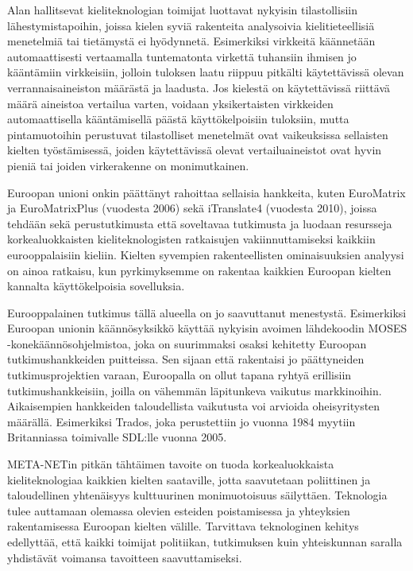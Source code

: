 \documentclass[]{../../metanetpaper}
\begin{document}
\begin{Parallel}[c]{70mm}{70mm}
{Alan hallitsevat kieliteknologian toimijat luottavat nykyisin tilastollisiin
lähestymistapoihin, joissa kielen syviä rakenteita analysoivia
kielitieteellisiä menetelmiä tai tietämystä ei hyödynnetä. Esimerkiksi
virkkeitä käännetään automaattisesti vertaamalla tuntematonta virkettä
tuhansiin ihmisen jo kääntämiin virkkeisiin, jolloin tuloksen laatu riippuu
pitkälti käytettävissä olevan verrannaisaineiston määrästä ja laadusta. Jos
kielestä on käytettävissä riittävä määrä aineistoa vertailua varten, voidaan
yksikertaisten virkkeiden automaattisella kääntämisellä päästä käyttökelpoisiin
tuloksiin, mutta pintamuotoihin perustuvat tilastolliset menetelmät ovat
vaikeuksissa sellaisten kielten työstämisessä, joiden käytettävissä olevat
vertailuaineistot ovat hyvin pieniä tai joiden virkerakenne on monimutkainen.

Euroopan unioni onkin päättänyt rahoittaa sellaisia hankkeita, kuten EuroMatrix
ja EuroMatrixPlus (vuodesta 2006) sekä iTranslate4 (vuodesta 2010), joissa
tehdään sekä perustutkimusta että soveltavaa tutkimusta ja luodaan resursseja
korkealuokkaisten kieliteknologisten ratkaisujen vakiinnuttamiseksi kaikkiin
eurooppalaisiin kieliin. Kielten syvempien rakenteellisten ominaisuuksien
analyysi on ainoa ratkaisu, kun pyrkimyksemme on rakentaa kaikkien Euroopan
kielten kannalta käyttökelpoisia sovelluksia.

Eurooppalainen tutkimus tällä alueella on jo saavuttanut menestystä.
Esimerkiksi Euroopan unionin käännösyksikkö käyttää nykyisin avoimen
lähdekoodin MOSES -konekäännösohjelmistoa, joka on suurimmaksi osaksi kehitetty
Euroopan tutkimushankkeiden puitteissa. Sen sijaan että rakentaisi jo
päättyneiden tutkimusprojektien varaan, Euroopalla on ollut tapana ryhtyä
erillisiin tutkimushankkeisiin, joilla on vähemmän läpitunkeva vaikutus
markkinoihin. Aikaisempien hankkeiden taloudellista vaikutusta voi arvioida
oheisyritysten määrällä. Esimerkiksi Trados, joka perustettiin jo vuonna 1984
myytiin Britanniassa toimivalle SDL:lle vuonna 2005.


META-NETin pitkän tähtäimen tavoite on tuoda korkealuokkaista
kieliteknologiaa kaikkien kielten saataville, jotta saavutetaan
poliittinen ja taloudellinen yhtenäisyys kulttuurinen monimuotoisuus
säilyttäen. Teknologia tulee auttamaan olemassa olevien esteiden
poistamisessa ja yhteyksien rakentamisessa Euroopan kielten
välille. Tarvittava teknologinen kehitys edellyttää, että kaikki
toimijat politiikan, tutkimuksen kuin yhteiskunnan saralla yhdistävät
voimansa tavoitteen saavuttamiseksi.

}
\end{Parallel}
\end{document}
